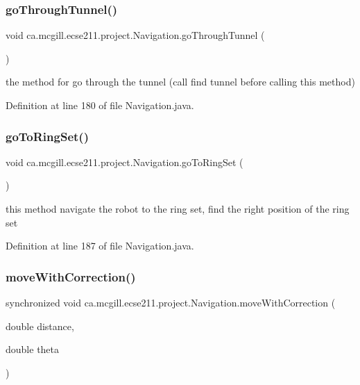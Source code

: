 \subsubsection{\texorpdfstring{go\+Through\+Tunnel()}{goThroughTunnel()}}
{\footnotesize\ttfamily void ca.\+mcgill.\+ecse211.\+project.\+Navigation.\+go\+Through\+Tunnel (\begin{DoxyParamCaption}{ }\end{DoxyParamCaption})}

the method for go through the tunnel (call find tunnel before calling this method) 

Definition at line 180 of file Navigation.\+java.

\mbox{\label{classca_1_1mcgill_1_1ecse211_1_1project_1_1_navigation_a0016a23ab5d544148a09948fb1a40e4c}} 
\subsubsection{\texorpdfstring{go\+To\+Ring\+Set()}{goToRingSet()}}
{\footnotesize\ttfamily void ca.\+mcgill.\+ecse211.\+project.\+Navigation.\+go\+To\+Ring\+Set (\begin{DoxyParamCaption}{ }\end{DoxyParamCaption})}

this method navigate the robot to the ring set, find the right position of the ring set 

Definition at line 187 of file Navigation.\+java.

\mbox{\label{classca_1_1mcgill_1_1ecse211_1_1project_1_1_navigation_a48eeb9ae2da23664421e8da5642054c7}} 
\subsubsection{\texorpdfstring{move\+With\+Correction()}{moveWithCorrection()}}
{\footnotesize\ttfamily synchronized void ca.\+mcgill.\+ecse211.\+project.\+Navigation.\+move\+With\+Correction (\begin{DoxyParamCaption}\item[{double}]{distance,  }\item[{double}]{theta }\end{DoxyParamCaption})}

